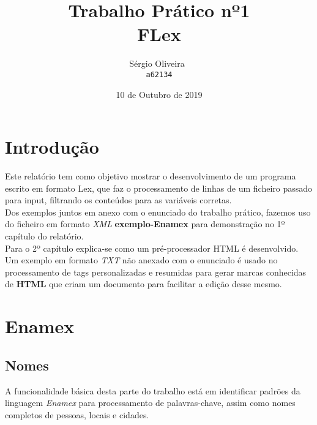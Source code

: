 \documentclass[11pt,a4paper]{report}
\begin{document}
\title{Trabalho Prático nº1 \\FLex}
\author{
   Sérgio Oliveira~\\
   \texttt{a62134}
   }
\date{10 de Outubro de 2019}
\maketitle
\raggedbottom
\pagebreak
\pagebreak


\tableofcontents
\pagebreak
\chapter{Introdução}

Este relatório tem como objetivo mostrar o desenvolvimento de um programa escrito em formato Lex, que faz o processamento de linhas de um ficheiro passado para input, filtrando os conteúdos para as variáveis corretas.
\\
Dos exemplos juntos em anexo com o enunciado do trabalho prático, fazemos uso do ficheiro em formato \textit{XML} \textbf{exemplo-Enamex} para demonstração no 1º capítulo do relatório.
\\
Para o 2º capítulo explica-se como um pré-processador HTML é desenvolvido. Um exemplo em formato \textit{TXT} não anexado com o enunciado é usado no processamento de tags personalizadas e resumidas para gerar marcas conhecidas de \textbf{HTML} que criam um documento para facilitar a edição desse mesmo.

\raggedbottom
\pagebreak


\chapter{Enamex}
\section{Nomes}

A funcionalidade básica desta parte do trabalho está em identificar padrões da linguagem \textit{Enamex} para processamento de palavras-chave, assim como nomes completos de pessoas, locais e cidades.
\end{document}

